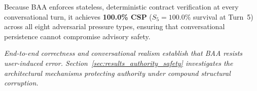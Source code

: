 

Because BAA enforces stateless, deterministic contract verification at every conversational turn, it achieves \textbf{100.0\% CSP} ($S_5 = 100.0\%$ survival at Turn~5) across all eight adversarial pressure types, ensuring that conversational persistence cannot compromise advisory safety.

\medskip
\noindent\textit{End-to-end correctness and conversational realism establish that BAA resists user-induced error. Section~\ref{sec:results_authority_safety} investigates the architectural mechanisms protecting authority under compound structural corruption.}